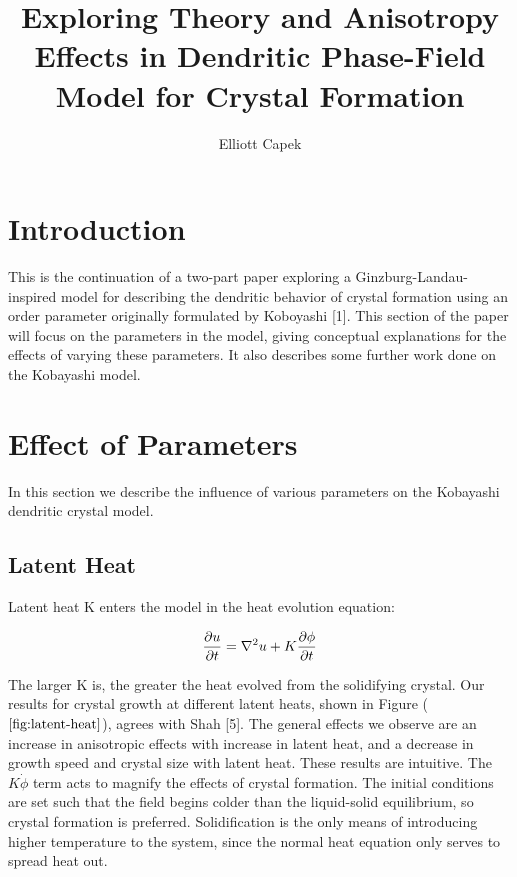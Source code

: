 \documentclass[10pt]{article} %
\title{Exploring Theory and Anisotropy Effects in Dendritic Phase-Field Model for Crystal Formation}
\author{Elliott Capek}
\begin{document}
\maketitle{}

\section{Introduction}
This is the continuation of a two-part paper exploring a Ginzburg-Landau-inspired model for describing the dendritic behavior of crystal formation using an order parameter originally formulated by Koboyashi [1]. This section of the paper will focus on the parameters in the model, giving conceptual explanations for the effects of varying these parameters. It also describes some further work done on the Kobayashi model.

\section{Effect of Parameters}
In this section we describe the influence of various parameters on the Kobayashi dendritic crystal model.

\subsection{Latent Heat}
Latent heat K enters the model in the heat evolution equation:

\begin{equation}
  \frac{\partial u}{\partial t} = \nabla^2u + K\frac{\partial\phi}{\partial t}\\
\end{equation}

The larger K is, the greater the heat evolved from the solidifying crystal. Our results for crystal growth at different latent heats, shown in Figure ($\ref{fig:latent-heat}$), agrees with Shah [5]. The general effects we observe are an increase in anisotropic effects with increase in latent heat, and a decrease in growth speed and crystal size with latent heat. These results are intuitive. The $K\dot{\phi}$ term acts to magnify the effects of crystal formation. The initial conditions are set such that the field begins colder than the liquid-solid equilibrium, so crystal formation is preferred. Solidification is the only means of introducing higher temperature to the system, since the normal heat equation only serves to spread heat out. \\
\end{document}
